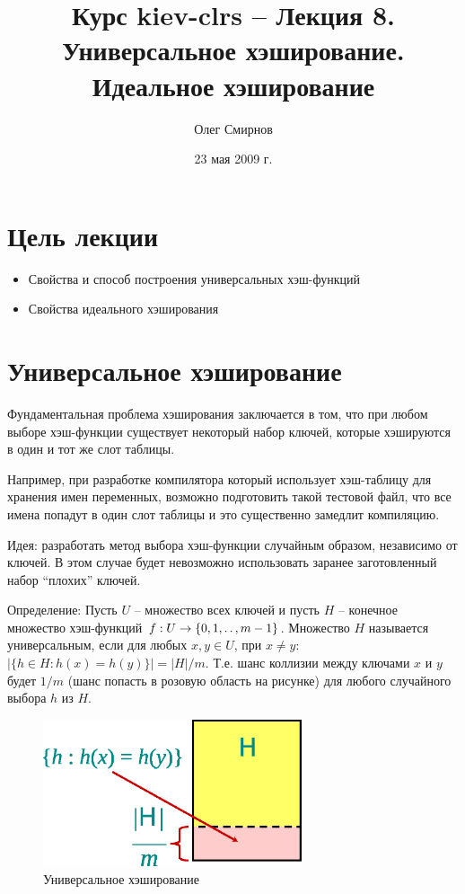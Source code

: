 \documentclass[11pt]{article}
\author{Олег Смирнов}
\title{Курс kiev-clrs -- Лекция 8. Универсальное хэширование. Идеальное хэширование}
\date{23 мая 2009 г.}
\begin{document}
\maketitle
\tableofcontents

\newpage
\setlength{\parskip}{1ex plus 0.5ex minus 0.2ex}
\section{Цель лекции}
\begin{itemize}
\item Свойства и способ построения универсальных хэш-функций
\item Свойства идеального хэширования
\end{itemize}

\section{Универсальное хэширование}

Фундаментальная проблема хэширования заключается в том, что при любом выборе хэш-функции существует некоторый набор ключей, которые хэшируются в один и тот же слот таблицы.

Например, при разработке компилятора который использует хэш-таблицу для хранения имен переменных, возможно подготовить такой тестовой файл, что все имена попадут в один слот таблицы и это существенно замедлит компиляцию.

Идея: разработать метод выбора хэш-функции случайным образом, независимо от ключей. В этом случае будет невозможно использовать заранее заготовленный набор ``плохих'' ключей.

Определение: Пусть $U$ -- множество всех ключей и пусть $H$ -- конечное множество хэш-функций $f: U \to \{0, 1, \mathinner{\ldotp\ldotp}, m-1\}$. Множество $H$ называется универсальным, если для любых $x, y \in U$, при $x \neq y$: $|\{h \in H:h(x) = h(y)\}| = |H|/m$. Т.е. шанс коллизии между ключами $x$ и $y$ будет $1/m$ (шанс попасть в розовую область на рисунке) для любого случайного выбора $h$ из $H$.
\begin{figure}[ht]
  \centering
  \includegraphics[width=3in]{lecture8/universal.eps}
  \caption{Универсальное хэширование}
  \label{fig:universal}
\end{figure}
\end{document}

